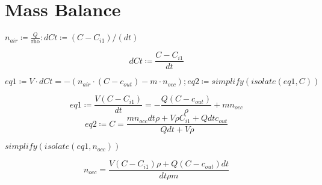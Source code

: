 \documentclass{article}
\begin{document}
\lstset{basicstyle=\ttfamily,breaklines=true,columns=flexible}
\pagestyle{empty}
\section{\textbf{Mass Balance}}
\begin{Maple Normal}

\end{Maple Normal}
\begin{Maple Normal}
{$ \displaystyle n_{\mathit{air}}\coloneqq \frac{Q}{\mathrm{rho}}\colon \mathit{dCt} \coloneqq (C -C_{\mathit{i1}})/(\mathit{dt}) $}
\end{Maple Normal}
\begin{dmath}\label{(1.1)}
\mathit{dCt} \coloneqq \frac{C -C_{\mathit{i1}}}{\mathit{dt}}
\end{dmath}
\begin{Maple Normal}
{$ \displaystyle \mathit{eq1} \coloneqq V \cdot \mathit{dCt} =-(n_{\mathit{air}}\cdot (C -c_{\mathit{out}})-m \cdot n_{\mathit{occ}});\mathit{eq2} \coloneqq \mathit{simplify} (\mathit{isolate} (\mathit{eq1} ,C)) $}
\end{Maple Normal}
\begin{dmath*}
\mathit{eq1} \coloneqq \frac{V \left(C -C_{\mathit{i1}}\right)}{\mathit{dt}}=-\frac{Q \left(C -c_{\mathit{out}}\right)}{\rho}+m n_{\mathit{occ}}
\end{dmath*}
\vspace{-\bigskipamount}
\begin{dmath}\label{(1.2)}
\mathit{eq2} \coloneqq C =\frac{m n_{\mathit{occ}} \mathit{dt} \rho +V \rho  C_{\mathit{i1}}+Q \mathit{dt} c_{\mathit{out}}}{Q \mathit{dt} +V \rho}
\end{dmath}
\begin{Maple Normal}
{$ \displaystyle \mathit{simplify} (\mathit{isolate} (\mathit{eq1} ,n_{\mathit{occ}})) $}
\end{Maple Normal}
\begin{dmath}\label{(1.3)}
n_{\mathit{occ}}=\frac{V \left(C -C_{\mathit{i1}}\right) \rho +Q \left(C -c_{\mathit{out}}\right) \mathit{dt}}{\mathit{dt} \rho  m}
\end{dmath}
\begin{Maple Normal}

\end{Maple Normal}
\end{document}
